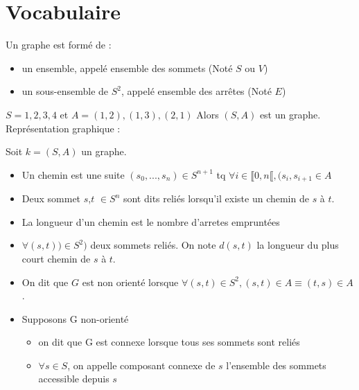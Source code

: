 

    
    \maketitle

\section{Vocabulaire}

Un graphe est formé de :
\begin{itemize}
\item un ensemble, appelé ensemble des sommets (Noté $S$ ou $V$)
\item un sous-ensemble de $S^2$, appelé ensemble des arrêtes (Noté $E$)
\end{itemize}

\begin{ex}
$S={1,2,3,4}$ et $A={(1,2),(1,3),(2,1)}$ Alors $(S,A)$ est un graphe.  
Représentation graphique :
\end{ex}

Soit $k=(S,A)$ un graphe.  
\begin{itemize}
\item Un chemin est une suite $(s_0,...,s_n) \in S^{n+1}$ tq $\forall i \in \llbracket 0,n\llbracket , (s_i,s_{i+1}\in A$  
\item Deux sommet $s$,$t$ $\in S^n$ sont dits reliés lorsqu'il existe un chemin de $s$ à $t$.
\item La longueur d'un chemin est le nombre d'arretes empruntées
\item $\forall (s,t)) \in S^2)$ deux sommets reliés. On note $d(s,t)$ la longueur du plus court chemin de $s$ à $t$.
\item On dit que $G$ est non orienté lorsque $\forall (s,t) \in S^2, (s,t) \in A \equiv (t,s) \in A$.  
\item Supposons G non-orienté
    \begin{itemize}
    \item on dit que G est connexe lorsque tous ses sommets sont reliés
    \item $\forall s \in S$, on appelle composant connexe de $s$ l'ensemble des sommets accessible depuis $s$
    \end{itemize}
\end{itemize}


